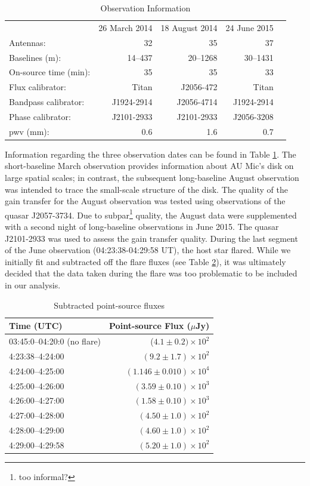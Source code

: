 \documentclass[12pt,oneside]{book}
\begin{document}
\begin{table}	
  \centering
	\caption{Observation Information}
  \label{tab:observations}
  \begin{tabular}{lrrrr}
    \toprule
    & 26 March 2014 & 18 August 2014 & 24 June 2015 \\
    \cmidrule(lr){2-4}
    Antennas: & 32 & 35 & 37 \\
    Baselines (m): & 14--437 & 20--1268 & 30--1431 \\
    On-source time (min): & 35 & 35 & 33 \\
    Flux calibrator: & Titan & J2056-472 & Titan \\
    Bandpass calibrator: & J1924-2914 & J2056-4714 & J1924-2914 \\
    Phase calibrator: & J2101-2933 & J2101-2933 & J2056-3208  \\
    pwv (mm): & 0.6 & 1.6 & 0.7 \\
    \bottomrule
  \end{tabular}
\end{table}

Information regarding the three observation dates can be found in Table \ref{tab:observations}. 
The short-baseline March observation provides information about AU Mic's disk on large spatial scales; in contrast, the subsequent long-baseline August observation was intended to trace the small-scale structure of the disk. 
The quality of the gain transfer for the August observation was tested using observations of the quasar J2057-3734.
Due to subpar\footnote{too informal?} quality, the August data were supplemented with a second night of long-baseline observations in June 2015. 
The quasar J2101-2933 was used to assess the gain transfer quality.
During the last segment of the June observation (04:23:38-04:29:58 UT), the host star flared. While we initially fit and subtracted off the flare fluxes (see Table \ref{tab:flare fluxes}), it was ultimately decided that the data taken during the flare was too problematic to be included in our analysis.

\begin{table}	
  \centering
	\caption{Subtracted point-source fluxes}
  \label{tab:flare fluxes}
  \begin{tabular}{lr}
    \toprule
    Time (UTC) & Point-source Flux ($\mu$Jy) \\
    \midrule
    03:45:0--04:20:0 (no flare) & ($4.1 \pm 0.2)  \times 10^2$\\
  	4:23:38--4:24:00 & $(9.2 \pm 1.7) \times 10^2$ \\
  	4:24:00--4:25:00 & $(1.146 \pm 0.010) \times 10^4$ \\
  	4:25:00--4:26:00 & $(3.59 \pm 0.10) \times 10^3$ \\
  	4:26:00--4:27:00 & $(1.58 \pm 0.10) \times 10^3$ \\
  	4:27:00--4:28:00 & $(4.50 \pm 1.0) \times 10^2$ \\
  	4:28:00--4:29:00 & $(4.60 \pm 1.0) \times 10^2$ \\
  	4:29:00--4:29:58 & $(5.20 \pm 1.0) \times 10^2$\\
    \bottomrule
  \end{tabular}
\end{table}
\end{document}
